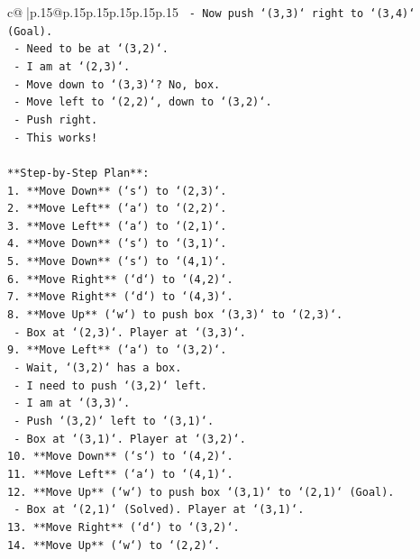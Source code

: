 \documentclass{article}
\begin{document}
{\begin{supertabular}{c@{$\;$}|p{.15\linewidth}@{}p{.15\linewidth}p{.15\linewidth}p{.15\linewidth}p{.15\linewidth}p{.15\linewidth}}
{{{\texttt{      {-} Now push `(3,3)` right to `(3,4)` (Goal).} \\
\texttt{        {-} Need to be at `(3,2)`.} \\
\texttt{        {-} I am at `(2,3)`.} \\
\texttt{        {-} Move down to `(3,3)`? No, box.} \\
\texttt{        {-} Move left to `(2,2)`, down to `(3,2)`.} \\
\texttt{        {-} Push right.} \\
\texttt{      {-} This works!} \\
\\ 
\texttt{**Step{-}by{-}Step Plan**:} \\
\texttt{1. **Move Down** (`s`) to `(2,3)`.} \\
\texttt{2. **Move Left** (`a`) to `(2,2)`.} \\
\texttt{3. **Move Left** (`a`) to `(2,1)`.} \\
\texttt{4. **Move Down** (`s`) to `(3,1)`.} \\
\texttt{5. **Move Down** (`s`) to `(4,1)`.} \\
\texttt{6. **Move Right** (`d`) to `(4,2)`.} \\
\texttt{7. **Move Right** (`d`) to `(4,3)`.} \\
\texttt{8. **Move Up** (`w`) to push box `(3,3)` to `(2,3)`.} \\
\texttt{   {-} Box at `(2,3)`. Player at `(3,3)`.} \\
\texttt{9. **Move Left** (`a`) to `(3,2)`.} \\
\texttt{   {-} Wait, `(3,2)` has a box.} \\
\texttt{   {-} I need to push `(3,2)` left.} \\
\texttt{   {-} I am at `(3,3)`.} \\
\texttt{   {-} Push `(3,2)` left to `(3,1)`.} \\
\texttt{   {-} Box at `(3,1)`. Player at `(3,2)`.} \\
\texttt{10. **Move Down** (`s`) to `(4,2)`.} \\
\texttt{11. **Move Left** (`a`) to `(4,1)`.} \\
\texttt{12. **Move Up** (`w`) to push box `(3,1)` to `(2,1)` (Goal).} \\
\texttt{    {-} Box at `(2,1)` (Solved). Player at `(3,1)`.} \\
\texttt{13. **Move Right** (`d`) to `(3,2)`.} \\
\texttt{14. **Move Up** (`w`) to `(2,2)`.} \\
}}}
\end{supertabular}}
\end{document}

